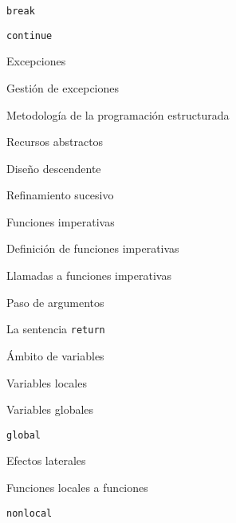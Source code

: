 \begin{longenum}
\begin{longenum}
\begin{longenum}
            \begin{longenum}
                \item \texttt{break}
                \item \texttt{continue}
                \item Excepciones
                \begin{longenum}
                    \item Gestión de excepciones
                \end{longenum}
            \end{longenum}
        \end{longenum}
        \item Metodología de la programación estructurada
        \begin{longenum}
            \item Recursos abstractos
            \item Diseño descendente
            \item Refinamiento sucesivo
        \end{longenum}
        \item Funciones imperativas
        \begin{longenum}
            \item Definición de funciones imperativas
            \item Llamadas a funciones imperativas
            \item Paso de argumentos
            \item La sentencia \texttt{return}
            \item Ámbito de variables
            \begin{longenum}
                \item Variables locales
                \item Variables globales
                \begin{longenum}
                    \item \texttt{global}
                    \item Efectos laterales
                \end{longenum}
            \end{longenum}
            \item Funciones locales a funciones
            \begin{longenum}
                \item \texttt{nonlocal}
            \end{longenum}

\end{longenum}
\end{longenum}
\end{longenum}
